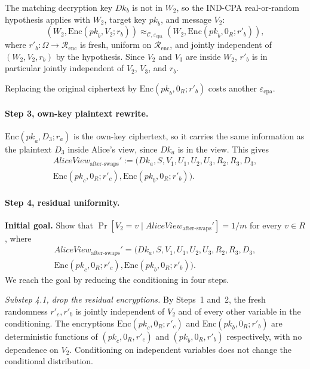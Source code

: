 \documentclass[11pt]{article}
\newcommand{\Renc}{\mathcal{R}_{\mathrm{enc}}}
\newcommand{\epscpa}{\varepsilon_{\mathrm{cpa}}}
\newcommand{\C}{\mathcal{C}}
\newcommand{\Encf}{\mathrm{Enc}}
\newcommand{\AliceViewHyb}{\mathit{AliceView}_{\textrm{after-swaps}}'}
\newcommand{\Dk}{\mathit{Dk}}
\newcommand{\pk}{\mathit{pk}}
\begin{document}
The matching decryption key $\Dk_b$ is not in $W_2$, so the IND-CPA real-or-random hypothesis applies with $W_2$, target key $\pk_b$, and message $V_2$:
\[
(W_2, \Encf(\pk_b, V_2; r_b)) \approx_{\C, \epscpa} (W_2, \Encf(\pk_b, 0_R; r'_b)),
\]
where $r'_b : \Omega \to \Renc$ is fresh, uniform on $\Renc$, and jointly independent of $(W_2, V_2, r_b)$ by the hypothesis. Since $V_2$ and $V_3$ are inside $W_2$, $r'_b$ is in particular jointly independent of $V_2$, $V_3$, and $r_b$.

Replacing the original ciphertext by $\Encf(\pk_b, 0_R; r'_b)$ costs another $\epscpa$.

\paragraph{Step 3, own-key plaintext rewrite.} $\Encf(\pk_a, D_3; r_a)$ is the own-key ciphertext, so it carries the same information as the plaintext $D_3$ inside Alice's view, since $\Dk_a$ is in the view. This gives
\begin{multline*}
\AliceViewHyb := \big( \Dk_a, S, V_1, U_1, U_2, U_3, R_2, R_3, D_3, \\
\Encf(\pk_c, 0_R; r'_c), \Encf(\pk_b, 0_R; r'_b) \big).
\end{multline*}

\paragraph{Step 4, residual uniformity.}

\textbf{Initial goal.} Show that $\Pr[V_2 = v \mid \AliceViewHyb] = 1/m$ for every $v \in R$, where
\begin{multline*}
\AliceViewHyb = \big( \Dk_a, S, V_1, U_1, U_2, U_3, R_2, R_3, D_3, \\
\Encf(\pk_c, 0_R; r'_c), \Encf(\pk_b, 0_R; r'_b) \big).
\end{multline*}
We reach the goal by reducing the conditioning in four steps.

\medskip

\textit{Substep 4.1, drop the residual encryptions.} By Steps~1 and~2, the fresh randomness $r'_c, r'_b$ is jointly independent of $V_2$ and of every other variable in the conditioning. The encryptions $\Encf(\pk_c, 0_R; r'_c)$ and $\Encf(\pk_b, 0_R; r'_b)$ are deterministic functions of $(\pk_c, 0_R, r'_c)$ and $(\pk_b, 0_R, r'_b)$ respectively, with no dependence on $V_2$. Conditioning on independent variables does not change the conditional distribution.
\end{document}
